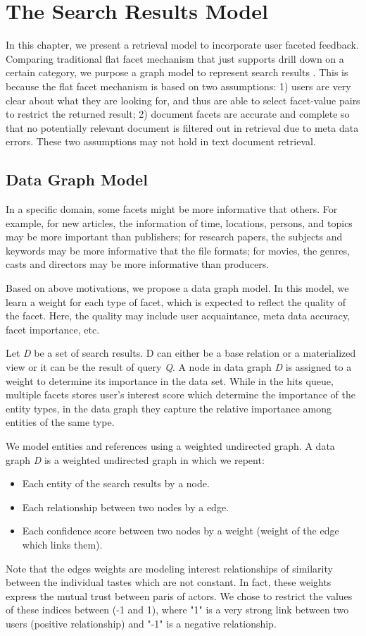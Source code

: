 \chapter{The Search Results Model}

In this chapter, we present a retrieval model to incorporate user faceted feedback. Comparing traditional flat facet mechanism that just supports drill down on a certain category, we purpose a graph model to represent search results . This is because the flat facet mechanism is based on two assumptions: 1) users are very clear about what they are looking for, and thus are able to select facet-value pairs to restrict the returned result; 2) document facets are accurate and complete so that no potentially relevant document is filtered out in retrieval due to meta data errors. These two assumptions may not hold in text document retrieval. 

\section{Data Graph Model}

In a specific domain, some facets might be more informative that others. For example, for new articles, the information of time, locations, persons, and topics may be more important than publishers; for research papers, the subjects and keywords may be more informative that the file formats; for movies, the genres, casts and directors may be more informative than producers.

Based on above motivations, we propose a data graph model. In this model, we learn a weight for each type of facet, which is expected to reflect the quality of the facet. Here, the quality may include user acquaintance, meta data accuracy, facet importance, etc.

Let {\it D} be a set of search results. D can either be a base relation or a materialized view or it can be the result of query {\it Q}. A node in data graph {\it D} is assigned to a weight to determine its importance in the data set. While in the hits queue, multiple facets stores user's interest score which determine the importance of the entity types, in the data graph they capture the relative importance among entities of the same type. 

We model entities and references using a weighted undirected graph. A data graph {\it D} is a weighted undirected graph in which we repent:
\begin{itemize}
	\item Each entity of the search results by a node.
	\item Each relationship between two nodes by a edge.
	\item Each confidence score between two nodes by a weight (weight of the edge which links them).
\end{itemize}

Note that the edges weights are modeling interest relationships of similarity between the individual tastes which are not constant. In fact, these weights express the mutual trust between paris of actors. We chose to restrict the values of these indices between (-1 and 1), where "1" is a very strong link between two users (positive relationship) and "-1" is a negative relationship.
